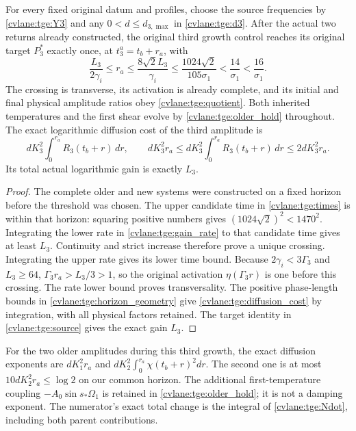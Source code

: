 \begin{cvlanetheorem}\label{cvlane:tge:actual_threshold}
For every fixed original datum and profiles, choose the source
frequencies by \eqref{cvlane:tge:Y3} and any $0<d\leq d_{3,\max}$ in
\eqref{cvlane:tge:d3}. After the actual two returns already constructed,
the original third growth control reaches its original target
$P_3^*$ exactly once, at $t_3^a=t_b+r_a$, with
\begin{equation}\label{cvlane:tge:times}
 \frac{L_3}{2\gamma_i}\leq r_a
       \leq\frac{8\sqrt2L_3}{\gamma_i}
       \leq\frac{1024\sqrt2}{105\sigma_1}
       <\frac{14}{\sigma_1}<\frac{16}{\sigma_1}.
\end{equation}
The crossing is transverse, its activation is already complete,
and its initial and final physical amplitude ratios obey
\eqref{cvlane:tge:quotient}. Both inherited temperatures and the first
shear evolve by \eqref{cvlane:tge:older_hold} throughout.
The exact logarithmic diffusion cost of the third amplitude is
\begin{equation}\label{cvlane:tge:diffusion_cost}
 dK_3^2\int_0^{r_a}R_3(t_b+r)\,dr,
 \qquad
 dK_3^2r_a\leq
 dK_3^2\int_0^{r_a}R_3(t_b+r)\,dr
                  \leq2dK_3^2r_a.
\end{equation}
Its total actual logarithmic gain is exactly $L_3$.
\end{cvlanetheorem}
\begin{proof}
The complete older and new systems were constructed on a fixed horizon
before the threshold was chosen. The upper candidate time in
\eqref{cvlane:tge:times} is within that horizon: squaring positive numbers
gives $(1024\sqrt2)^2<1470^2$. Integrating the lower rate in
\eqref{cvlane:tge:gain_rate} to that candidate time gives at least $L_3$.
Continuity and strict increase therefore prove a unique crossing.
Integrating the upper rate gives its lower time bound.
Because $2\gamma_i<3\Gamma_3$ and $L_3\geq64$,
$\Gamma_3r_a>L_3/3>1$, so the original activation
$\eta(\Gamma_3r)$ is one before this crossing.
The rate lower bound proves transversality. The positive phase-length
bounds in \eqref{cvlane:tge:horizon_geometry} give
\eqref{cvlane:tge:diffusion_cost} by integration, with all physical factors
retained. The target identity in \eqref{cvlane:tge:source} gives the exact
gain $L_3$.
\end{proof}

For the two older amplitudes during this third growth, the exact
diffusion exponents are $dK_1^2r_a$ and
$dK_2^2\int_0^{r_a}\chi(t_b+r)^2dr$. The second one is at most
$10dK_2^2r_a\leq\log2$ on our common horizon. The additional
first-temperature coupling $-A_0\sin s_*\Omega_1$ is retained in
\eqref{cvlane:tge:older_hold}; it is not a damping exponent.
The numerator's exact total change is the integral of
\eqref{cvlane:tge:Ndot}, including both parent contributions.


